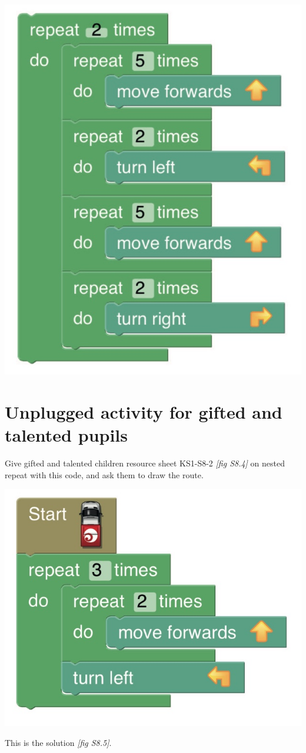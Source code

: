 \documentclass{../../../lessonplan}
\begin{document}
\begin{lessonplan}
\begin{center}
\includegraphics[width=.667\linewidth]{example2.jpg}
\end{center}

\section*{Unplugged activity for gifted and talented pupils}

Give gifted and talented children resource sheet KS1-S8-2 \textit{[fig S8.4]} on nested repeat with this code, and ask them to draw the route.


\begin{center}
\includegraphics[width=.667\linewidth]{example3.jpg}
\end{center}

This is the solution \textit{[fig S8.5]}.


\end{lessonplan}
\end{document}

